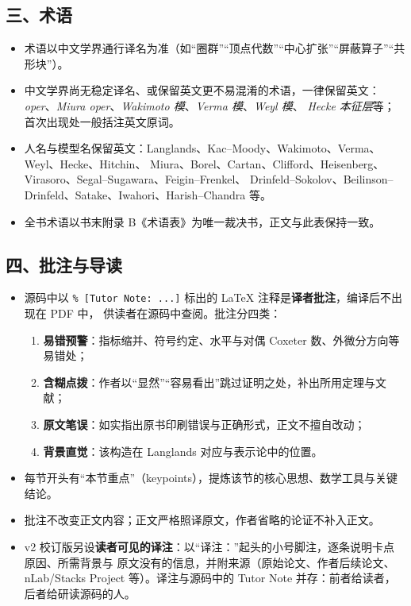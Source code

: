 \subsection*{三、术语}

\begin{itemize}[leftmargin=1.8em]
    \item 术语以中文学界通行译名为准（如“圈群”“顶点代数”“中心扩张”“屏蔽算子”“共形块”）。
    \item 中文学界尚无稳定译名、或保留英文更不易混淆的术语，一律保留英文：
          \emph{oper}、\emph{Miura oper}、\emph{Wakimoto 模}、\emph{Verma 模}、\emph{Weyl 模}、
          \emph{Hecke 本征层}等；首次出现处一般括注英文原词。
    \item 人名与模型名保留英文：Langlands、Kac--Moody、Wakimoto、Verma、Weyl、Hecke、Hitchin、
          Miura、Borel、Cartan、Clifford、Heisenberg、Virasoro、Segal--Sugawara、Feigin--Frenkel、
          Drinfeld--Sokolov、Beilinson--Drinfeld、Satake、Iwahori、Harish--Chandra 等。
    \item 全书术语以书末附录 B《术语表》为唯一裁决书，正文与此表保持一致。
\end{itemize}

\subsection*{四、批注与导读}

\begin{itemize}[leftmargin=1.8em]
    \item 源码中以 \verb|% [Tutor Note: ...]| 标出的 \LaTeX{} 注释是\textbf{译者批注}，编译后不出现在 PDF 中，
          供读者在源码中查阅。批注分四类：
          \begin{enumerate}[leftmargin=1.8em,itemsep=1pt]
              \item \textbf{易错预警}：指标缩并、符号约定、水平与对偶 Coxeter 数、外微分方向等易错处；
              \item \textbf{含糊点拨}：作者以“显然”“容易看出”跳过证明之处，补出所用定理与文献；
              \item \textbf{原文笔误}：如实指出原书印刷错误与正确形式，正文不擅自改动；
              \item \textbf{背景直觉}：该构造在 Langlands 对应与表示论中的位置。
          \end{enumerate}
    \item 每节开头有“本节重点”（keypoints），提炼该节的核心思想、数学工具与关键结论。
    \item 批注不改变正文内容；正文严格照译原文，作者省略的论证不补入正文。
    \item v2 校订版另设\textbf{读者可见的译注}：以“译注：”起头的小号脚注，逐条说明卡点原因、所需背景与
          原文没有的信息，并附来源（原始论文、作者后续论文、nLab/Stacks Project 等）。译注与源码中的
          Tutor Note 并存：前者给读者，后者给研读源码的人。
\end{itemize}

